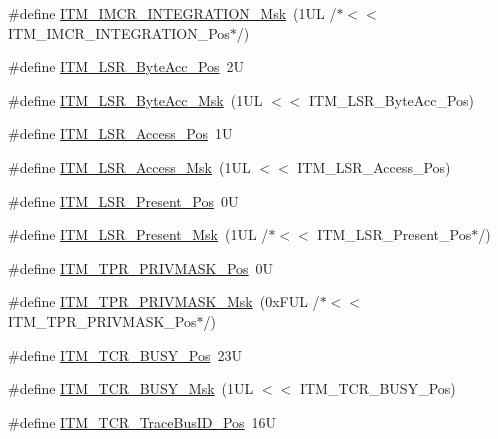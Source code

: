 \begin{DoxyCompactItemize}
\#define \hyperlink{group___c_m_s_i_s___i_t_m_ga8838bd3dd04c1a6be97cd946364a3fd2}{I\+T\+M\+\_\+\+I\+M\+C\+R\+\_\+\+I\+N\+T\+E\+G\+R\+A\+T\+I\+O\+N\+\_\+\+Msk}~(1\+U\+L /$\ast$$<$$<$ I\+T\+M\+\_\+\+I\+M\+C\+R\+\_\+\+I\+N\+T\+E\+G\+R\+A\+T\+I\+O\+N\+\_\+\+Pos$\ast$/)
\item 
\#define \hyperlink{group___c_m_s_i_s___i_t_m_gabfae3e570edc8759597311ed6dfb478e}{I\+T\+M\+\_\+\+L\+S\+R\+\_\+\+Byte\+Acc\+\_\+\+Pos}~2U
\item 
\#define \hyperlink{group___c_m_s_i_s___i_t_m_ga91f492b2891bb8b7eac5b58de7b220f4}{I\+T\+M\+\_\+\+L\+S\+R\+\_\+\+Byte\+Acc\+\_\+\+Msk}~(1\+U\+L $<$$<$ I\+T\+M\+\_\+\+L\+S\+R\+\_\+\+Byte\+Acc\+\_\+\+Pos)
\item 
\#define \hyperlink{group___c_m_s_i_s___i_t_m_ga144a49e12b83ad9809fdd2769094fdc0}{I\+T\+M\+\_\+\+L\+S\+R\+\_\+\+Access\+\_\+\+Pos}~1U
\item 
\#define \hyperlink{group___c_m_s_i_s___i_t_m_gac8ae69f11c0311da226c0c8ec40b3d37}{I\+T\+M\+\_\+\+L\+S\+R\+\_\+\+Access\+\_\+\+Msk}~(1\+U\+L $<$$<$ I\+T\+M\+\_\+\+L\+S\+R\+\_\+\+Access\+\_\+\+Pos)
\item 
\#define \hyperlink{group___c_m_s_i_s___i_t_m_gaf5740689cf14564d3f3fd91299b6c88d}{I\+T\+M\+\_\+\+L\+S\+R\+\_\+\+Present\+\_\+\+Pos}~0U
\item 
\#define \hyperlink{group___c_m_s_i_s___i_t_m_gaa5bc2a7f5f1d69ff819531f5508bb017}{I\+T\+M\+\_\+\+L\+S\+R\+\_\+\+Present\+\_\+\+Msk}~(1\+U\+L /$\ast$$<$$<$ I\+T\+M\+\_\+\+L\+S\+R\+\_\+\+Present\+\_\+\+Pos$\ast$/)
\item 
\#define \hyperlink{group___c_m_s_i_s___i_t_m_ga7abe5e590d1611599df87a1884a352e8}{I\+T\+M\+\_\+\+T\+P\+R\+\_\+\+P\+R\+I\+V\+M\+A\+S\+K\+\_\+\+Pos}~0U
\item 
\#define \hyperlink{group___c_m_s_i_s___i_t_m_ga168e089d882df325a387aab3a802a46b}{I\+T\+M\+\_\+\+T\+P\+R\+\_\+\+P\+R\+I\+V\+M\+A\+S\+K\+\_\+\+Msk}~(0x\+F\+U\+L /$\ast$$<$$<$ I\+T\+M\+\_\+\+T\+P\+R\+\_\+\+P\+R\+I\+V\+M\+A\+S\+K\+\_\+\+Pos$\ast$/)
\item 
\#define \hyperlink{group___c_m_s_i_s___i_t_m_ga9174ad4a36052c377cef4e6aba2ed484}{I\+T\+M\+\_\+\+T\+C\+R\+\_\+\+B\+U\+S\+Y\+\_\+\+Pos}~23U
\item 
\#define \hyperlink{group___c_m_s_i_s___i_t_m_ga43ad7cf33de12f2ef3a412d4f354c60f}{I\+T\+M\+\_\+\+T\+C\+R\+\_\+\+B\+U\+S\+Y\+\_\+\+Msk}~(1\+U\+L $<$$<$ I\+T\+M\+\_\+\+T\+C\+R\+\_\+\+B\+U\+S\+Y\+\_\+\+Pos)
\item 
\#define \hyperlink{group___c_m_s_i_s___i_t_m_gaca0281de867f33114aac0636f7ce65d3}{I\+T\+M\+\_\+\+T\+C\+R\+\_\+\+Trace\+Bus\+I\+D\+\_\+\+Pos}~16U
$$
\end{DoxyCompactItemize}

